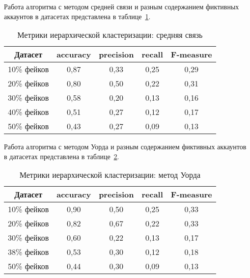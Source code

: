 Работа алгоритма с методом средней связи и разным содержанием фиктивных аккаунтов в датасетах представлена в таблице~\ref{tabular:hierclustering3}.
\vspace{-0.3cm}
\begin{table}[H]
    \caption{Метрики иерархической кластеризации: средняя связь}
    \vspace{1em}
    \small
    \begin{tabular}{|l|c|c|c|c|}
    \hline
    \multicolumn{1}{|c|}{\textbf{Датасет}} & \textbf{accuracy} & \textbf{precision} & \textbf{recall} & \textbf{F-measure} \\ \hline
    10\% фейков & 0,87 & 0,33 & 0,25 & 0,29 \\ \hline
    20\% фейков & 0,80 & 0,50 & 0,22 & 0,31 \\ \hline
    30\% фейков & 0,58 & 0,20 & 0,13 & 0,16 \\ \hline
    40\% фейков & 0,51 & 0,27 & 0,12 & 0,17 \\ \hline
    50\% фейков & 0,43 & 0,27 & 0,09 & 0,13 \\ \hline
    \end{tabular}
    \label{tabular:hierclustering3}
\end{table}

Работа алгоритма с методом Уорда и разным содержанием фиктивных аккаунтов в датасетах представлена в таблице~\ref{tabular:hierclustering4}.
\vspace{-0.3cm}
\begin{table}[H]
    \caption{Метрики иерархической кластеризации: метод Уорда}
    \vspace{1em}
    \small
    \begin{tabular}{|l|c|c|c|c|}
    \hline
    \multicolumn{1}{|c|}{\textbf{Датасет}} & \textbf{accuracy} & \textbf{precision} & \textbf{recall} & \textbf{F-measure} \\ \hline
    10\% фейков & 0,90 & 0,50 & 0,25 & 0,33 \\ \hline
    20\% фейков & 0,82 & 0,67 & 0,22 & 0,33 \\ \hline
    30\% фейков & 0,60 & 0,22 & 0,13 & 0,17 \\ \hline
    38\% фейков & 0,53 & 0,30 & 0,12 & 0,18 \\ \hline
    50\% фейков & 0,44 & 0,30 & 0,09 & 0,13 \\ \hline
    \end{tabular}
    \label{tabular:hierclustering4}
\end{table}


